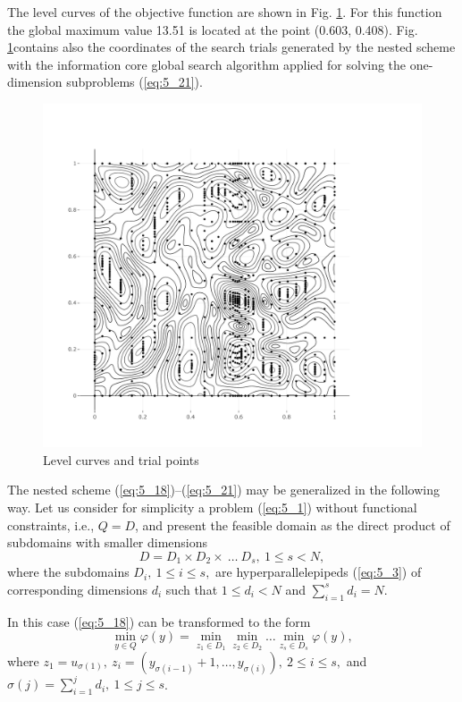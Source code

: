  The level curves of the objective function are shown  in Fig. \ref{fig:5_2}.  For this function the global maximum value 13.51 is located at the point (0.603, 0.408). Fig. \ref{fig:5_2}contains also the coordinates of the search trials generated by the nested scheme with the information core global search algorithm  applied for solving the one-dimension subproblems (\ref{eq:5_21}).
\begin{figure}[t]
\centering
\includegraphics[width=1.1\linewidth]{figures/figure_5_2.pdf}
\caption{Level curves and trial points}
\label{fig:5_2}    
\end{figure}

The nested scheme (\ref{eq:5_18})--(\ref{eq:5_21}) may be generalized in the following way. Let us consider for simplicity a problem (\ref{eq:5_1}) without functional constraints, i.e., $Q=D$, and present the feasible domain  as the direct product of subdomains with smaller dimensions
\begin{displaymath}
D=D_1\times D_2\times\:\ldots\: D_s,\:1\leq s<N,
\end{displaymath}
where the subdomains $D_i,\:1\leq i\leq s,$ are hyperparallelepipeds (\ref{eq:5_3}) of corresponding dimensions $d_i$ such that $1\leq d_i<N$ and $\sum_{i=1}^s{d_i}=N$.

In this case (\ref{eq:5_18}) can be transformed to the form
\begin{displaymath}
\min_{y\in Q}\varphi(y)=\min_{z_1\in D_1}\min_{z_2\in D_2}\ldots\min_{z_s\in D_s}\varphi(y),
\end{displaymath}
where $z_1=u_{\sigma(1)},\:z_i=(y_{\sigma{(i-1)}}+1,\ldots, y_{\sigma(i)}),\:2\leq i\leq s,$ and $\sigma(j)=\sum_{i=1}^j{d_i},\:1\leq j\leq s$.

